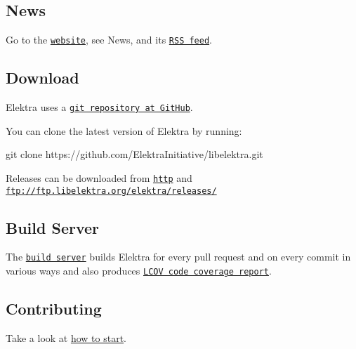 \subsection*{News}

Go to the \href{https://www.libelektra.org}{\tt website}, see News, and its \href{https://www.libelektra.org/news/feed.rss}{\tt R\+SS feed}.

\subsection*{Download}

Elektra uses a \href{https://github.com/ElektraInitiative/libelektra}{\tt git repository at Git\+Hub}.

You can clone the latest version of Elektra by running\+: \begin{DoxyVerb}     git clone https://github.com/ElektraInitiative/libelektra.git
\end{DoxyVerb}


Releases can be downloaded from \href{https://www.libelektra.org/ftp/elektra/releases/}{\tt http} and {\ttfamily \href{ftp://ftp.libelektra.org/elektra/releases/}{\tt ftp\+://ftp.\+libelektra.\+org/elektra/releases/}}

\subsection*{Build Server}

The \href{https://build.libelektra.org/}{\tt build server} builds Elektra for every pull request and on every commit in various ways and also produces \href{https://doc.libelektra.org/coverage/master/debian-stable-full/}{\tt L\+C\+OV code coverage report}.

\subsection*{Contributing}

Take a look at \hyperlink{doc_IDEAS_md}{how to start}. 